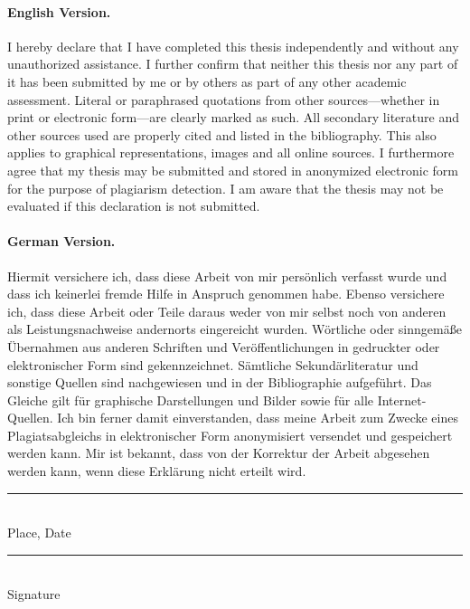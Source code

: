 \documentclass[
11pt, %
english, %
singlespacing, %
headsepline, %
]{MastersThesis} %
\theoremstyle{definition}
\theoremstyle{definition}
\theoremstyle{definition}
\theoremstyle{definition}
\theoremstyle{remark}
\theoremstyle{remark}
\begin{document}

\begin{declaration}
\addchaptertocentry{\authorshipname} %

\paragraph{English Version.} I hereby declare that I have completed this thesis
independently and without any unauthorized assistance. I further confirm that
neither this thesis nor any part of it has been submitted by me or by others as
part of any other academic assessment. Literal or paraphrased quotations from
other sources—whether in print or electronic form—are clearly marked as such.
All secondary literature and other sources used are properly cited and listed in
the bibliography. This also applies to graphical representations, images and
all online sources. I furthermore agree that my thesis may be submitted and
stored in anonymized electronic form for the purpose of plagiarism detection. I
am aware that the thesis may not be evaluated if this declaration is not
submitted.

\paragraph{German Version.} Hiermit versichere ich, dass diese Arbeit von mir
persönlich verfasst wurde und dass ich keinerlei fremde Hilfe in Anspruch
genommen habe. Ebenso versichere ich, dass diese Arbeit oder Teile daraus weder
von mir selbst noch von anderen als Leistungsnachweise andernorts eingereicht
wurden. Wörtliche oder sinngemäße Übernahmen aus anderen Schriften und
Veröffentlichungen in gedruckter oder elektronischer Form sind gekennzeichnet.
Sämtliche Sekundärliteratur und sonstige Quellen sind nachgewiesen und in der
Bibliographie aufgeführt. Das Gleiche gilt für graphische Darstellungen und
Bilder sowie für alle Internet-Quellen. Ich bin ferner damit einverstanden, dass
meine Arbeit zum Zwecke eines Plagiatsabgleichs in elektronischer Form
anonymisiert versendet und gespeichert werden kann. Mir ist bekannt, dass von
der Korrektur der Arbeit abgesehen werden kann, wenn diese Erklärung nicht
erteilt wird.
\vspace{1.5cm}

\begin{flushleft}
  \begin{minipage}[t]{0.5\textwidth}
    \noindent\rule[0.5em]{18em}{0.5pt} \\[0em] %
    Place, Date
  \end{minipage}%
  \begin{minipage}[t]{0.45\textwidth}
    \raggedleft
    \noindent\rule[0.5em]{12em}{0.5pt} \\[0em] %
    Signature
  \end{minipage}
\end{flushleft}
\end{declaration}
\end{document}

